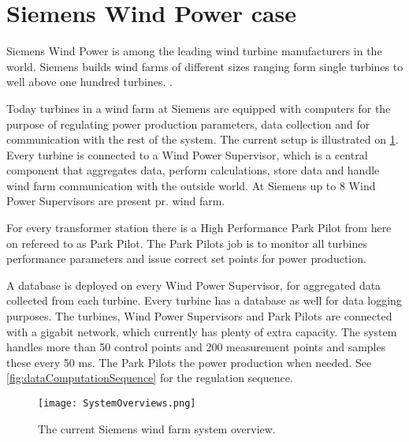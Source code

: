 \section{Siemens Wind Power case}


\label{sec:SiemensCase}
Siemens Wind Power is among the leading wind turbine manufacturers in the world. Siemens builds wind farms of different sizes ranging form single turbines to well above one hundred turbines. \cite{simensOffShoreProjects, simensOnShoreProjects}.

Today turbines in a wind farm at Siemens are equipped with computers for the purpose of regulating power production parameters, data collection and for communication with the rest of the system. The current setup is illustrated on \cref{fig:currentSiemensSetup}. Every turbine is connected to a Wind Power Supervisor, which is a central component that aggregates data, perform calculations, store data and handle wind farm communication with the outside world. At Siemens up to 8  Wind Power Supervisors are present pr. wind farm.

For every transformer station there is a High Performance Park Pilot from here on refereed to as Park Pilot. The Park Pilots job is to monitor all turbines performance parameters and issue correct set points for power production.

A database is deployed on every  Wind Power Supervisor, for aggregated data collected from each turbine. Every turbine has a database as well for data logging purposes. The turbines, Wind Power Supervisors and Park Pilots are connected with a gigabit network, which currently has plenty of extra capacity. The system handles more than 50 control points and 200 measurement points and samples these every 50 ms. The Park Pilots the power production when needed. See \cref{fig:dataComputationSequence} for the regulation sequence.

\begin{figure}
	\centering
	\texttt{[image: SystemOverviews.png]} 
	\caption[The current Siemens wind farm system overview]{
		\label{fig:currentSiemensSetup} 
		\footnotesize{%
			The current Siemens wind farm system overview.
		}
	}
\end{figure}

